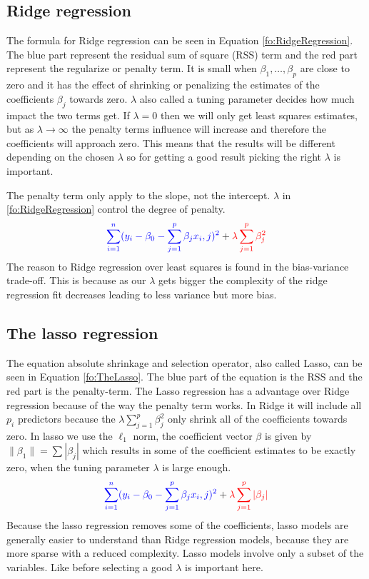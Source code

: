 \subsection{Ridge regression}
The formula for Ridge regression can be seen in Equation \ref{fo:RidgeRegression}. The blue part represent the residual sum of square (RSS) term and the red part represent the regularize or penalty term. It is small when $\beta_1, \ldots ,\beta_p$ are close to zero and it has the effect of shrinking or penalizing the estimates of the coefficients $\beta_j$ towards zero. $\lambda$ also called a tuning parameter decides how much impact the two terms get. If $\lambda = 0$ then we will only get least squares estimates, but as $ \lambda \to \infty$ the penalty terms influence will increase and therefore the coefficients will approach zero. This means that the results will be different depending on the chosen $\lambda$ so for getting a good result picking the right $\lambda$ is important.

\noindent The penalty term only apply to the slope, not the intercept. $\lambda$ in \ref{fo:RidgeRegression} control the degree of penalty.
\begin{align}\label{fo:RidgeRegression}
\color{blue} \sum_{i=1}^{n} ( y_i - \beta_0 - \sum_{j=1}^{p} \beta_j x_i,j )^2 \color{black} + \color{red} \lambda \sum_{j=1}^{p} \beta^2_j 
\end{align}
The reason to Ridge regression over least squares is found in the bias-variance trade-off. This is because as our $\lambda$ gets bigger the complexity of the ridge regression fit decreases leading to less variance but more bias.

\subsection{The lasso regression}
The equation absolute shrinkage and selection operator, also called Lasso, can be seen in Equation \ref{fo:TheLasso}. The blue part of the equation is the RSS and the red part is the penalty-term. The Lasso regression has a advantage over Ridge regression because of the way the penalty term works. In Ridge it will include all $p_i$ predictors because the $\lambda \sum_{j=1}^{p} \beta^2_j$ only shrink all of the coefficients towards zero. In lasso we use the $\ell_1$ norm, the coefficient vector $\beta$ is given by $ \lVert \beta_1 \rVert = \sum | \beta_j |$ which results in some of the coefficient estimates to be exactly zero, when the tuning parameter $\lambda$ is large enough.
\begin{align}\label{fo:TheLasso}
\color{blue} \sum_{i=1}^{n} ( y_i - \beta_0 - \sum_{j=1}^{p} \beta_j x_i,j )^2 \color{black} +  \color{red} \lambda \sum_{j=1}^{p} |\beta_j|
\end{align}
Because the lasso regression removes some of the coefficients, lasso models are generally easier to understand than Ridge regression models, because they are more sparse with a reduced complexity. Lasso models involve only a subset of the variables. Like before selecting a good $\lambda$ is important here.

